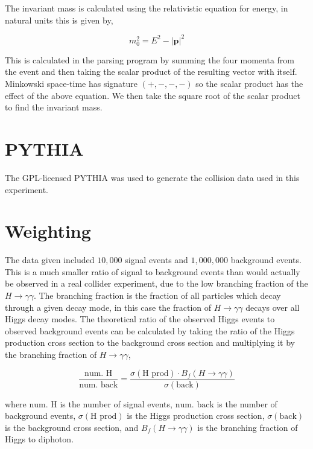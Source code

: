 \documentclass[11pt]{amsart}
\begin{document}
\begin{multicols}{2}
The invariant mass is calculated using the relativistic equation for energy, in natural units this is given by,

\begin{equation}
  \label{eq:invariantmass}
  m_0^2 = E^2 - {|\mathbf{p}|}^2
\end{equation}

This is calculated in the parsing program by summing the four momenta from the event and then taking the scalar product of the resulting vector with itself. Minkowski space-time has signature $(+, -, -, -)$ so the scalar product has the effect of the above equation. We then take the square root of the scalar product to find the invariant mass.

\section{PYTHIA}

The GPL-licensed PYTHIA was used to generate the collision data used in this experiment. \cite{pythia}

\section{Weighting}

The data given included $10,000$ signal events and $1,000,000$ background events. This is a much smaller ratio of signal to background events than would actually be observed in a real collider experiment, due to the low branching fraction of the $H \to \gamma\gamma$. The branching fraction is the fraction of all particles which decay through a given decay mode, in this case the fraction of $H \to \gamma\gamma$ decays  over all Higgs decay modes. The theoretical ratio of the observed Higgs events to observed background events can be calculated by taking the ratio of the Higgs production cross section to the background cross section and multiplying it by the branching fraction of $H \to \gamma\gamma$,

\begin{equation}
  \label{eq:weighting}
  \frac{\text{num. H}}{\text{num. back}} = \frac{\sigma{\left(\text{H prod}\right)} \cdot B_f\left(H\to\gamma\gamma\right)}{\sigma{\left(\text{back}\right)}}
\end{equation}

where $\text{num. H}$ is the number of signal events, $\text{num. back}$ is the number of background events, $\sigma{\left(\text{H prod}\right)}$ is the Higgs production cross section, $\sigma{\left(\text{back}\right)}$ is the background cross section, and $B_f\left(H\to\gamma\gamma\right)$ is the branching fraction of Higgs to diphoton.


\end{multicols}
\end{document}
